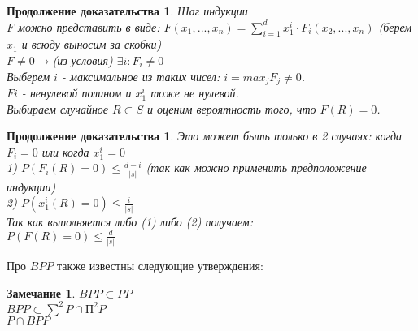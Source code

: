 \documentclass{beamer}
\theoremstyle{plain}
\newtheorem{rmk}[thm]{Замечание}
\newtheorem{proof-rus-cont}[thm]{Продолжение доказательства}
\theoremstyle{definition}
\begin{document}
\begin{frame}
    \begin{proof-rus-cont}
        Шаг индукции\\
        $F$ можно представить в виде:
        $F(x_1, ... , x_n) = \sum_{i=1}^d x_1^i \cdot F_i(x_2, ... , x_n)$ (берем $x_1$ и всюду выносим за скобки) \\
        $F \neq 0 \rightarrow$(из условия) $\exists i: F_i \neq 0$\\
        Выберем $i$ - максимальное из таких чисел: $i = max_{j} F_j \neq 0$.\\
        $Fi$ - ненулевой полином и $x_1^i$ тоже не нулевой. \\
        Выбираем случайное $R \subset S$ и оценим вероятность того, что $F(R) = 0$.
        
    \end{proof-rus-cont}
\end{frame}

\begin{frame}
    \begin{proof-rus-cont}
        Это может быть только в 2 случаях: когда $F_i = 0$ или когда $x_1^i = 0$\\
        1) $P(F_i(R)=0) \leq \frac{d-i}{|s|}$ (так как можно применить предположение индукции) \\
        2) $P(x_1^i(R) = 0) \leq \frac{i}{|s|}$\\
        Так как выполняется либо (1) либо (2) получаем:\\
        $P(F(R)=0)\leq \frac{d}{|s|}$
    \end{proof-rus-cont}
\end{frame}

\begin{frame}
    Про $BPP$ также известны следующие утверждения:
    \begin{rmk}
        $BPP \subset PP$ \\
        $BPP \subset \sum^2P \cap П^2P$ \\
        $P \cap BPP$
    \end{rmk}
\end{frame}
\end{document}

